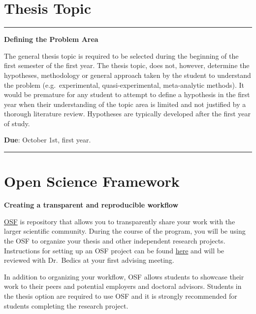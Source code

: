 \documentclass[openany]{book}
\begin{document}
\hypertarget{thesis-topic}{%
\section{Thesis Topic}\label{thesis-topic}}

\begin{center}\rule{0.5\linewidth}{0.5pt}\end{center}

\textbf{Defining the Problem Area}

The general thesis topic is required to be selected during the beginning of the first semester of the first year. The thesis topic, does not, however, determine the hypotheses, methodology or general approach taken by the student to understand the problem (e.g.~experimental, quasi-experimental, meta-analytic methods). It would be premature for any student to attempt to define a hypothesis in the first year when their understanding of the topic area is limited and not justified by a thorough literature review. Hypotheses are typically developed after the first year of study.

\textbf{Due}: October 1st, first year.

\begin{center}\rule{0.5\linewidth}{0.5pt}\end{center}

\hypertarget{open-science-framework}{%
\section{Open Science Framework}\label{open-science-framework}}

\textbf{Creating a transparent and reproducible workflow}

\href{https://osf.io/}{OSF} is repository that allows you to transparently share your work with the larger scientific community. During the course of the program, you will be using the OSF to organize your thesis and other independent research projects. Instructions for setting up an OSF project can be found \href{https://speakerdeck.com/jdbedics/osf-setup-and-class-project-introduction}{here} and will be reviewed with Dr.~Bedics at your first advising meeting.

In addition to organizing your workflow, OSF allows students to showcase their work to their peers and potential employers and doctoral advisors. Students in the thesis option are required to use OSF and it is strongly recommended for students completing the research project.
\end{document}
